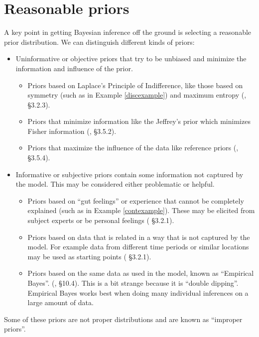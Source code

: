 \documentclass[12pt,vu]{adammath}
\theoremstyle{plain}
\theoremstyle{definition}
\theoremstyle{remark}
\begin{document}
\section{Reasonable priors}
A key point in getting Bayesian inference off the ground is selecting a reasonable prior distribution.
We can distinguish different kinds of priors:
\begin{itemize}
\item Uninformative or objective priors that try to be unbiased and minimize the information and influence of the prior.
  \begin{itemize}
  \item Priors based on Laplace's Principle of Indifference, like those based on symmetry (such as in Example \ref{discexample}) and maximum entropy (\cite{maxent}, \cite{bayesianchoice} \S 3.2.3).
  \item Priors that minimize information like the Jeffrey's prior which minimizes Fisher information (\cite{jeffreys}, \cite{bayesianchoice} \S 3.5.2).
  \item Priors that maximize the influence of the data like reference priors (\cite{referencepriors}, \cite{bayesianchoice} \S 3.5.4).
  \end{itemize}
\item Informative or subjective priors contain some information not captured by the model.
  This may be considered either problematic or helpful.
  \begin{itemize}
  \item Priors based on ``gut feelings'' or experience that cannot be completely explained (such as in Example \ref{contexample}).
    These may be elicited from subject experts or be personal feelings (\cite{bayesianchoice} \S 3.2.1).
  \item Priors based on data that is related in a way that is not captured by the model.
    For example data from different time periods or similar locations may be used as starting points (\cite{bayesianchoice} \S 3.2.1).
  \item Priors based on the same data as used in the model, known as ``Empirical Bayes''. (\cite{empericalbayes}, \cite{bayesianchoice} \S 10.4).
    This is a bit strange because it is ``double dipping''.
    Empirical Bayes works best when doing many individual inferences on a large amount of data.
  \end{itemize}
\end{itemize}

Some of these priors are not proper distributions and are known as ``improper priors''.
\end{document}
